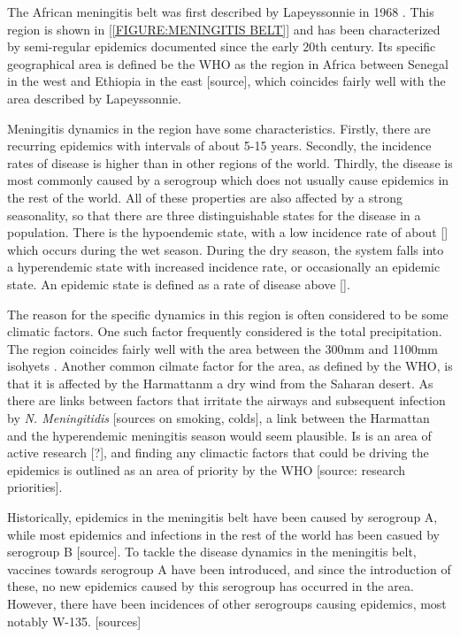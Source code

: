\documentclass[10pt,a4paper]{article}
\begin{document}
The African meningitis belt was first described by Lapeyssonnie in 1968 \cite{lapeyssonnie}. This region is shown in \cref{[FIGURE:MENINGITIS BELT]} and has been characterized by semi-regular epidemics documented since the early 20th century. Its specific geographical area is defined be the WHO as the region in Africa between Senegal in the west and Ethiopia in the east [source], which coincides fairly well with the area described by Lapeyssonnie.

Meningitis dynamics in the region have some characteristics. Firstly, there are recurring epidemics with intervals of about 5-15 years. Secondly, the incidence rates of disease is higher than in other regions of the world. Thirdly, the disease is most commonly caused by a serogroup which does not usually cause epidemics in the rest of the world. All of these properties are also affected by a strong seasonality, so that there are three distinguishable states for the disease in a population. There is the hypoendemic state, with a low incidence rate of about [] which occurs during the wet season. During the dry season, the system falls into a hyperendemic state with increased incidence rate, or occasionally an epidemic state. An epidemic state is defined as a rate of disease above []. \cite{mueller2010hypothetical}

The reason for the specific dynamics in this region is often considered to be some climatic factors. One such factor frequently considered is the total precipitation. The region coincides fairly well with the area between the 300mm and 1100mm isohyets \cite{molesworth2002meningitis}. Another common cilmate factor for the area, as defined by the WHO, is that it is affected by the Harmattanm a dry wind from the Saharan desert. As there are links between factors that irritate the airways and subsequent infection by \emph{N. Meningitidis} [sources on smoking, colds], a link between the Harmattan and the hyperendemic meningitis season would seem plausible. Is is an area of active research [?], and finding any climactic factors that could be driving the epidemics is outlined as an area of priority by the WHO [source: research priorities].

Historically, epidemics in the meningitis belt have been caused by serogroup A, while most epidemics and infections in the rest of the world has been casued by serogroup B [source]. To tackle the disease dynamics in the meningitis belt, vaccines towards serogroup A have been introduced, and since the introduction of these, no new epidemics caused by this serogroup has occurred in the area. However, there have been incidences of other serogroups causing epidemics, most notably W-135. [sources]
\end{document}
